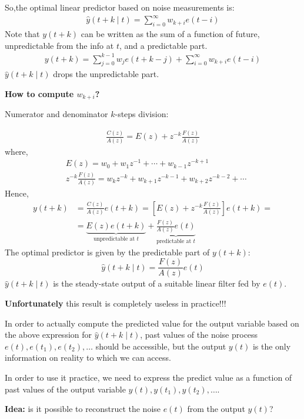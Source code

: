 So,the optimal linear predictor based on noise measurements is:
\begin{align*}
	\hat{y}(t+k \mid t) = \sum_{i=0}^{\infty}w_{k+i} e(t-i)
\end{align*}
Note that $y(t+k)$ can be written as the sum of a function of future, unpredictable from the info at $t$, and a predictable part. 
\begin{align*}
	y(t+k)=\sum_{j=0}^{k-1} w_{j} e(t+k-j)+\sum_{i=0}^{\infty} w_{k+i} e(t-i)
\end{align*}
$\hat{y}(t+k \mid t) $ drops the unpredictable part.

\textbf{How to compute $w_{k+i}$?}

Numerator and denominator $k$-steps division:

\begin{align*}
	\frac{C(z)}{A(z)}=E(z)+z^{-k} \frac{F(z)}{A(z)}
\end{align*}
where,
\begin{align*}
	&E(z)=w_{0}+w_{1} z^{-1}+\cdots+w_{k-1} z^{-k+1} \\
	&z^{-k} \frac{F(z)}{A(z)}=w_{k} z^{-k}+w_{k+1} z^{-k-1}+w_{k+2} z^{-k-2}+\cdots
\end{align*}
Hence,
\begin{align*}
	y(t+k) &=\frac{C(z)}{A(z)} e(t+k)=\left[E(z)+z^{-k} \frac{F(z)}{A(z)}\right] e(t+k)=\\
	&=\underbrace{E(z)e(t+k)}_{\text{unpredictable at }t}+\underbrace{\frac{F(z)}{A(z)}e(t)}_{\text{predictable at }t}
\end{align*}
The optimal predictor is given by the predictable part of $y(t + k)$:
$$
\hat{y}(t+k \mid t) = \frac{F(z)}{A(z)}e(t)
$$
$\hat{y}(t+k \mid t)$ is the steady-state output of a suitable linear filter 
fed by $e(t)$.

\textbf{Unfortunately} this result is 
completely useless in practice!!! 

In order to actually compute the predicted value for the output 
variable based on the above expression for $\hat{y}(t+k \mid t)$, past values of the noise process $e(t),e(t_1),e(t_2),\ldots$ should be accessible, but the output $y(t)$ is the only 
information on reality to 
which we can access.

In order to use it practice, we need to express the predict value as a 
function of past values of the output variable $y(t), y(t_1), y(t_2),\ldots$.

\textbf{Idea:} is it possible to reconstruct 
the noise $e(t)$ from the output $y(t)$? 

